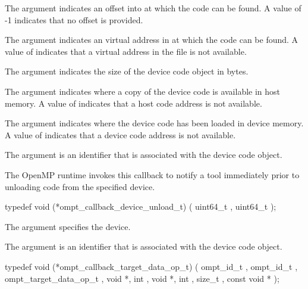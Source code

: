 The argument  indicates an offset into  at which the code can be found. A value of -1 indicates that
no offset is provided.

The argument  indicates an virtual address in  at which the code can be found.
A value of  indicates that a virtual address in the file is not 
available.

The argument  indicates the size of the device code object in bytes.

The argument  indicates where a copy of the device code is available in host memory.
A value of  indicates that a host code address is not available.

The argument  indicates where the device code has been loaded in device memory.
A value of  indicates that a device code address is not available.

The argument  is an identifier that is associated with the device code object.


\label{sec:ompt_callback_device_unload_t}

\summary
The OpenMP runtime invokes this callback to notify a tool immediately prior to unloading code from the specified device.

\format


\begin{ccppspecific}
\begin{omptCallback}
typedef void (*ompt_callback_device_unload_t) (
  uint64_t ,
  uint64_t 
);
\end{omptCallback}

\end{ccppspecific}


\argdesc

The argument  specifies the device.

The argument  is an identifier that is associated with the device code object.


\label{sec:ompt_callback_target_data_op_t}
\format


\begin{ccppspecific}
\begin{omptCallback}
typedef void (*ompt_callback_target_data_op_t) (
  ompt_id_t ,
  ompt_id_t ,
  ompt_target_data_op_t ,
  void *,
  int ,
  void *,
  int ,
  size_t ,
  const void *
);
\end{omptCallback}
\end{ccppspecific}


